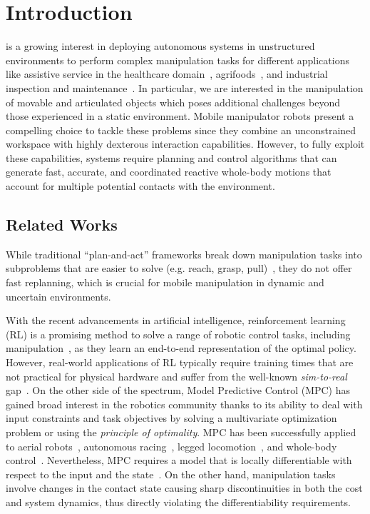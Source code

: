 \section{Introduction} \label{sec:introduction}
\showthe\font
{} is a growing interest in deploying autonomous systems in unstructured environments to perform complex manipulation tasks for different applications like assistive service in the healthcare domain~\cite{cooper2020ari}, agrifoods~\cite{duckett2018agricultural}, and industrial inspection and maintenance~\cite{lattanzi2017review}. In particular, we are interested in the manipulation of movable and articulated objects which poses additional challenges beyond those experienced in a static environment. Mobile manipulator robots present a compelling choice to tackle these problems since they combine an unconstrained workspace with highly dexterous interaction capabilities. However, to fully exploit these capabilities, systems require planning and control algorithms that can generate fast, accurate, and coordinated reactive whole-body motions that account for multiple potential contacts with the environment. 

\subsection{Related Works}

While traditional ``plan-and-act'' frameworks break down manipulation tasks into subproblems that are easier to solve (e.g. reach, grasp, pull)~\cite{Murali2020}, they do not offer fast replanning, which is crucial for mobile manipulation in dynamic and uncertain environments.

With the recent advancements in artificial intelligence, reinforcement learning (RL) is a promising method to solve a range of robotic control tasks, including manipulation~\cite{finn2016deep}, as they learn an end-to-end representation of the optimal policy. However, real-world applications of RL typically require training times that are not practical for physical hardware and suffer from the well-known \textit{sim-to-real} gap~\cite{chebotar2019closing}. 
On the other side of the spectrum, Model Predictive Control (MPC) has gained broad interest in the robotics community thanks to its ability to deal with input constraints and task objectives by solving a multivariate optimization problem or using the \textit{principle of optimality}. 
MPC has been successfully applied to aerial robots~\cite{peric2021direct}, autonomous racing~\cite{liniger2015optimization}, legged locomotion~\cite{grandia2019frequency}, and whole-body control~\cite{minniti2019whole}. 
Nevertheless, MPC requires a model that is locally differentiable with respect to the input and the state~\cite{buchli2017optimal}. On the other hand, manipulation tasks involve changes in the contact state causing sharp discontinuities in both the cost and system dynamics, thus directly violating the differentiability requirements. 



